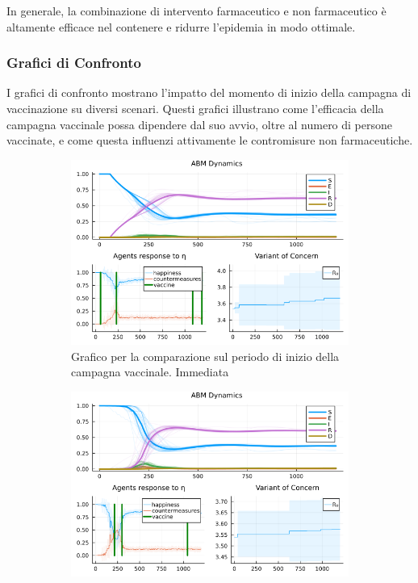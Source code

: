 In generale, la combinazione di intervento farmaceutico e non 
farmaceutico è altamente efficace nel contenere e ridurre 
l'epidemia in modo ottimale.

\subsubsection{Grafici di Confronto}

I grafici di confronto mostrano l'impatto del momento di inizio della 
campagna di vaccinazione su diversi scenari. Questi grafici illustrano 
come l'efficacia della campagna vaccinale possa dipendere dal suo avvio, 
oltre al numero di persone vaccinate, e come questa influenzi attivamente
le contromisure non farmaceutiche.

\begin{figure}[H]
	\centering
	\begin{subfigure}[b]{0.45\textwidth}
		\centering
		\includegraphics[width=\textwidth]{img/SocialNetworkABM_2_A.png}
		\caption{Grafico per la comparazione sul periodo di inizio della campagna vaccinale. Immediata}
		\label{fig:comparison_all_1}
	\end{subfigure}
	\hfill
	\begin{subfigure}[b]{0.45\textwidth}
		\centering
		\includegraphics[width=\textwidth]{img/SocialNetworkABM_4_A.png}

\end{subfigure}
\end{figure}
